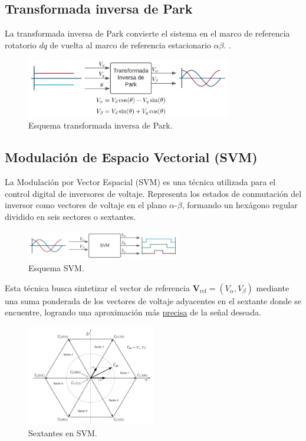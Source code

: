 \documentclass[11pt]{report}
\begin{document}
\subsection{Transformada inversa de Park}
La transformada inversa de Park convierte el sistema en el marco de referencia rotatorio \(dq\) de vuelta al marco de referencia estacionario \(\alpha\beta\). \cite{AN1078}.

\begin{figure}[ht]
	\centering
	\includegraphics[width=0.8\textwidth]{imagenes/Diagramas/park_inv.png}
	\caption{Esquema transformada inversa de Park.}
\end{figure}
\FloatBarrier

\newpage
\subsection{Modulación de Espacio Vectorial (SVM)}
La Modulación por Vector Espacial (SVM) es una técnica utilizada para el control digital de inversores de voltaje. Representa los estados de conmutación del inversor como vectores de voltaje en el plano $\alpha$-$\beta$, formando un hexágono regular dividido en seis sectores o sextantes.

\begin{figure}[ht]
	\centering
	\includegraphics[width=0.6\textwidth]{imagenes/Diagramas/SVM.png}
	\caption{Esquema SVM.}
\end{figure}
\FloatBarrier

Esta técnica busca sintetizar el vector de referencia $\mathbf{V}_{\text{ref}}=(V_{\alpha},V_{\beta})$ mediante una suma ponderada de los vectores de voltaje adyacentes en el sextante donde se encuentre, logrando una aproximación más \href{https://www.youtube.com/watch?v=NY0ffyEu6uo}{precisa} de la señal deseada.

\begin{figure}[ht]
	\centering
	\includegraphics[width=0.5\textwidth]{imagenes/Diagramas/sectantes.png}
	\caption{Sextantes en SVM.}
\end{figure}
\FloatBarrier
\end{document}

